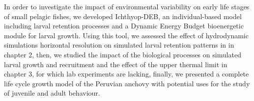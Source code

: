 In order to investigate the impact of environmental variability on early life stages of small pelagic fishes, we developed Ichthyop-DEB, an individual-based model \citep{LettVerl2008} including larval retention processes and a Dynamic Energy Budget \citep{Kooi2009} bioenergetic module for larval growth. Using this tool, we assessed the effect of hydrodynamic simulations horizontal resolution on simulated larval retention patterns in in chapter 2, then, we studied the impact of the biological processes on simulated larval growth and recruitment and the effect of the upper thermal limit in chapter 3, for which lab experiments are lacking, finally, we presented a complete life cycle growth model of the Peruvian anchovy with potential uses for the study of juvenile and adult behaviour.\\

\clearpage
